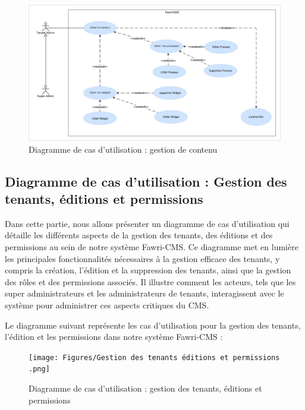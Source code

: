 
\begin{figure}[H]
  \centering
  \includegraphics[width=17cm]{Figures/gestion de contenu.png}
  \caption{Diagramme de cas d'utilisation : gestion de contenu}
\end{figure}



\subsection{Diagramme de cas d'utilisation : Gestion des tenants, éditions et permissions}

\hspace{\parindent}Dans cette partie, nous allons présenter un diagramme de cas d'utilisation qui détaille les différents aspects de la gestion des tenants, des éditions et des permissions au sein de notre système Fawri-CMS. Ce diagramme met en lumière les principales fonctionnalités nécessaires à la gestion efficace des tenants, y compris la création, l'édition et la suppression des tenants, ainsi que la gestion des rôles et des permissions associés. Il illustre comment les acteurs, tels que les super administrateurs et les administrateurs de tenants, interagissent avec le système pour administrer ces aspects critiques du CMS.

Le diagramme suivant représente les cas d'utilisation pour la gestion des tenants, l'édition et les permissions dans notre système Fawri-CMS :

\begin{figure}[H]
  \centering
  \texttt{[image: Figures/Gestion des tenants éditions et permissions .png]}
  \caption{Diagramme de cas d'utilisation : gestion des tenants, éditions et permissions}
\end{figure}





